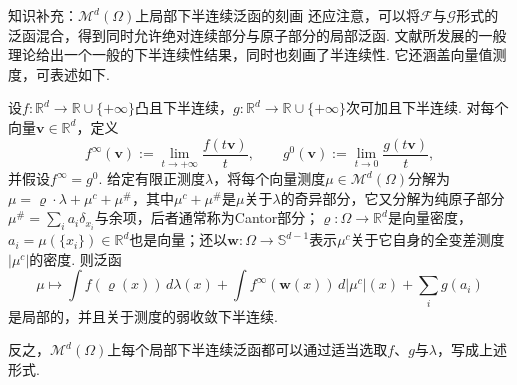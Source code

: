 \begin{sourcebox}{知识补充：$\mathscr M^d(\Omega)$上局部下半连续泛函的刻画}\label{box:7.1}
还应注意，可以将$\mathscr F$与$\mathscr G$形式的泛函混合，得到同时允许绝对连续部分与原子部分的局部泛函. 文献\cite{b67,b68,b69}所发展的一般理论给出一个一般的下半连续性结果，同时也刻画了半连续性. 它还涵盖向量值测度，可表述如下.
\begin{theorem*}
设$f:\mathbb R^d\to\mathbb R\cup\{+\infty\}$凸且下半连续，$g:\mathbb R^d\to\mathbb R\cup\{+\infty\}$次可加且下半连续. 对每个向量$\mathbf v\in\mathbb R^d$，定义
\[
 f^\infty(\mathbf v):=\lim_{t\to+\infty}\frac{f(t\mathbf v)}t,
 \qquad g^0(\mathbf v):=\lim_{t\to0}\frac{g(t\mathbf v)}t,
\]
并假设$f^\infty=g^0$. 给定有限正测度$\lambda$，将每个向量测度$\mu\in\mathscr M^d(\Omega)$分解为$\mu=\varrho\cdot\lambda+\mu^c+\mu^\#$，其中$\mu^c+\mu^\#$是$\mu$关于$\lambda$的奇异部分，它又分解为纯原子部分$\mu^\#=\sum_i a_i\delta_{x_i}$与余项，后者通常称为Cantor部分；$\varrho:\Omega\to\mathbb R^d$是向量密度，$a_i=\mu(\{x_i\})\in\mathbb R^d$也是向量；还以$\mathbf w:\Omega\to\mathbb S^{d-1}$表示$\mu^c$关于它自身的全变差测度$|\mu^c|$的密度. 则泛函
\[
 \mu\mapsto\int f(\varrho(x))\,d\lambda(x)
       +\int f^\infty(\mathbf w(x))\,d|\mu^c|(x)+\sum_i g(a_i)
\]
是局部的，并且关于测度的弱收敛下半连续.

反之，$\mathscr M^d(\Omega)$上每个局部下半连续泛函都可以通过适当选取$f$、$g$与$\lambda$，写成上述形式.
\end{theorem*}
\end{sourcebox}
